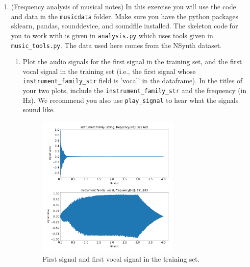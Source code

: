 \documentclass[12pt,twoside]{article}
\begin{document}
\begin{enumerate}
 \newpage
 \item  (Frequency analysis of musical notes) In this exercise you will
  use the code and data in the \texttt{musicdata} folder.  Make sure you have
  the python packages sklearn, pandas, sounddevice, and soundfile
  installed.  The skeleton code for you to work with is given in
  \texttt{analysis.py} which uses tools given in
  \texttt{music\_tools.py}.  The data used here comes from the NSynth
  dataset.

  \begin{enumerate}
  \item Plot the audio signals for the first signal in the training
    set, and the first vocal signal in the training set (i.e., the
    first signal whose \texttt{instrument\_family\_str} field is
    'vocal' in the dataframe).  In the titles of your two plots, include the
    \texttt{instrument\_family\_str} and the frequency (in Hz).
    We recommend you also use \texttt{play\_signal}
    to hear what the signals sound like.
    
	\begin{figure}[H]
		\centering
		\captionsetup{justification=centering}
		\includegraphics[width=200pt]{code/musicdata/signals.pdf}
		\caption{First signal and first vocal signal in the training set.}
	\end{figure}


\end{enumerate}
\end{enumerate}
\end{document}
